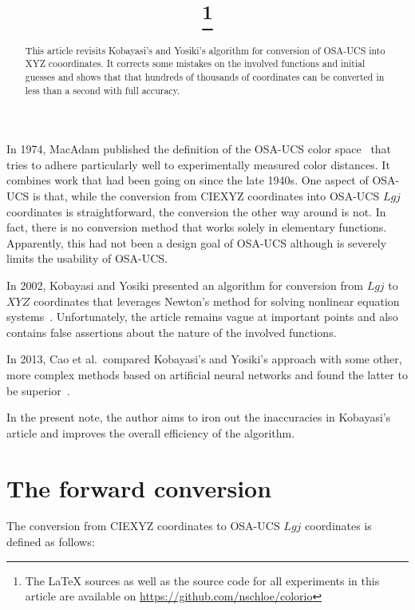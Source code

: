 \documentclass{scrartcl}
\title{\mytitle\footnote{The LaTeX sources as well as the source code for all
experiments in this article are available on \url{https://github.com/nschloe/colorio}}}
\author{\myauthor}
\theoremstyle{named}
\begin{document}
\maketitle

\begin{abstract}
This article revisits Kobayasi's and Yosiki's algorithm for conversion of OSA-UCS into
  XYZ cooordinates. It corrects some mistakes on the involved functions and initial
  guesses and shows that that hundreds of thousands of coordinates can be converted in
  less than a second with full accuracy.
\end{abstract}

In 1974, MacAdam published the definition of the OSA-UCS color space~\cite{macadam} that
tries to adhere particularly well to experimentally measured color distances. It
combines work that had been going on since the late 1940s. One aspect of OSA-UCS is
that, while the conversion from CIEXYZ coordinates into OSA-UCS $Lgj$ coordinates is
straightforward, the conversion the other way around is not. In fact, there is no
conversion method that works solely in elementary functions. Apparently, this had not
been a design goal of OSA-UCS although is severely limits the usability of OSA-UCS.

In 2002, Kobayasi and Yosiki presented an algorithm for conversion from $Lgj$ to $XYZ$
coordinates that leverages Newton's method for solving nonlinear equation
systems~\cite{kobayasi}. Unfortunately, the article remains vague at important points
and also contains false assertions about the nature of the involved functions.

In 2013, Cao et al.\ compared Kobayasi's and Yosiki's approach with some other, more
complex methods based on artificial neural networks and found the latter to be
superior~\cite{cao}.

In the present note, the author aims to iron out the inaccuracies in Kobayasi's article
and improves the overall efficiency of the algorithm.

\section{The forward conversion}

The conversion from CIEXYZ coordinates to OSA-UCS $Lgj$ coordinates is defined as
follows:
\end{document}
